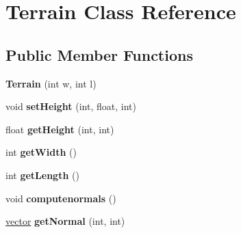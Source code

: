 \hypertarget{classTerrain}{\section{\-Terrain \-Class \-Reference}
\label{classTerrain}
}
\subsection*{\-Public \-Member \-Functions}
\begin{DoxyCompactItemize}
\item 
\hypertarget{classTerrain_a414f72bc43ab2b6116760dd40ef2bdd4}{{\bfseries \-Terrain} (int w, int l)}\label{classTerrain_a414f72bc43ab2b6116760dd40ef2bdd4}

\item 
\hypertarget{classTerrain_ae47ff62d4b41f35965aff289a4276823}{void {\bfseries set\-Height} (int, float, int)}\label{classTerrain_ae47ff62d4b41f35965aff289a4276823}

\item 
\hypertarget{classTerrain_a0161c7115d1f23d2eb124af93df105e3}{float {\bfseries get\-Height} (int, int)}\label{classTerrain_a0161c7115d1f23d2eb124af93df105e3}

\item 
\hypertarget{classTerrain_a27da184f3e92abbcd9a87665468c7dda}{int {\bfseries get\-Width} ()}\label{classTerrain_a27da184f3e92abbcd9a87665468c7dda}

\item 
\hypertarget{classTerrain_a2a976def2ae9cb8ec3ce77bb69cebebb}{int {\bfseries get\-Length} ()}\label{classTerrain_a2a976def2ae9cb8ec3ce77bb69cebebb}

\item 
\hypertarget{classTerrain_a37bad234df702ef7b0d1cdca62be956f}{void {\bfseries computenormals} ()}\label{classTerrain_a37bad234df702ef7b0d1cdca62be956f}

\item 
\hypertarget{classTerrain_ac4fd4cba30f04b2e1b10c1a64f1f3c84}{\hyperlink{classvector}{vector} {\bfseries get\-Normal} (int, int)}\label{classTerrain_ac4fd4cba30f04b2e1b10c1a64f1f3c84}

\end{DoxyCompactItemize}
